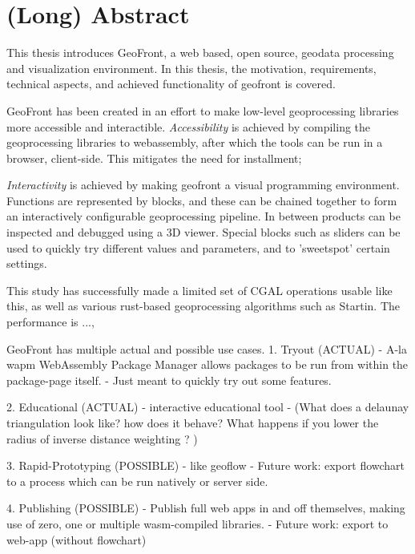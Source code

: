 
\chapter*{ (Long) Abstract }

This thesis introduces GeoFront, a web based, open source, geodata processing and visualization environment. 
In this thesis, the motivation, requirements, technical aspects, and achieved functionality of geofront is covered. 

GeoFront has been created in an effort to make low-level geoprocessing libraries more accessible and interactible.
\emph{Accessibility} is achieved by compiling the geoprocessing libraries to webassembly, after which the tools can be run in a browser, client-side. 
This mitigates the need for installment; 

\emph{Interactivity} is achieved by making geofront a visual programming environment. 
Functions are represented by blocks, and these can be chained together to form an interactively configurable geoprocessing pipeline. 
In between products can be inspected and debugged using a 3D viewer. 
Special blocks such as sliders can be used to quickly try different values and parameters, and to 'sweetspot' certain settings.

This study has successfully made a limited set of CGAL operations usable like this, as well as various rust-based geoprocessing algorithms such as Startin.
The performance is ..., 

GeoFront has multiple actual and possible use cases. 
1. Tryout (ACTUAL)
   - A-la wapm WebAssembly Package Manager allows packages to be run from within the package-page itself. 
  - Just meant to quickly try out some features.

2. Educational (ACTUAL)
   - interactive educational tool
   - (What does a delaunay triangulation look like? how does it behave? What happens if you lower the radius of inverse distance weighting ? )

3. Rapid-Prototyping (POSSIBLE)
   - like geoflow
   - Future work: export flowchart to a process which can be run natively or server side.

4. Publishing (POSSIBLE)
   - Publish full web apps in and off themselves, making use of zero, one or multiple wasm-compiled libraries.  
   - Future work: export to web-app (without flowchart)

